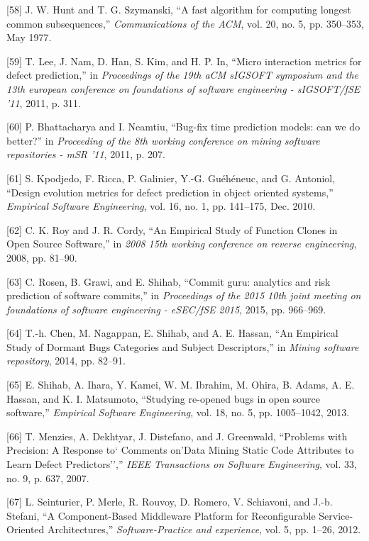 \documentclass[conference]{IEEEtran}
\begin{document}
{[}58{]} J. W. Hunt and T. G. Szymanski, ``A fast algorithm for
computing longest common subsequences,'' \emph{Communications of the
ACM}, vol. 20, no. 5, pp. 350--353, May 1977.

{[}59{]} T. Lee, J. Nam, D. Han, S. Kim, and H. P. In, ``Micro
interaction metrics for defect prediction,'' in \emph{Proceedings of the
19th aCM sIGSOFT symposium and the 13th european conference on
foundations of software engineering - sIGSOFT/fSE '11}, 2011, p. 311.

{[}60{]} P. Bhattacharya and I. Neamtiu, ``Bug-fix time prediction
models: can we do better?'' in \emph{Proceeding of the 8th working
conference on mining software repositories - mSR '11}, 2011, p. 207.

{[}61{]} S. Kpodjedo, F. Ricca, P. Galinier, Y.-G. Gu{é}h{é}neuc, and G.
Antoniol, ``Design evolution metrics for defect prediction in object
oriented systems,'' \emph{Empirical Software Engineering}, vol. 16, no.
1, pp. 141--175, Dec. 2010.

{[}62{]} C. K. Roy and J. R. Cordy, ``An Empirical Study of Function
Clones in Open Source Software,'' in \emph{2008 15th working conference
on reverse engineering}, 2008, pp. 81--90.

{[}63{]} C. Rosen, B. Grawi, and E. Shihab, ``Commit guru: analytics and
risk prediction of software commits,'' in \emph{Proceedings of the 2015
10th joint meeting on foundations of software engineering - eSEC/fSE
2015}, 2015, pp. 966--969.

{[}64{]} T.-h. Chen, M. Nagappan, E. Shihab, and A. E. Hassan, ``An
Empirical Study of Dormant Bugs Categories and Subject Descriptors,'' in
\emph{Mining software repository}, 2014, pp. 82--91.

{[}65{]} E. Shihab, A. Ihara, Y. Kamei, W. M. Ibrahim, M. Ohira, B.
Adams, A. E. Hassan, and K. I. Matsumoto, ``Studying re-opened bugs in
open source software,'' \emph{Empirical Software Engineering}, vol. 18,
no. 5, pp. 1005--1042, 2013.

{[}66{]} T. Menzies, A. Dekhtyar, J. Distefano, and J. Greenwald,
``Problems with Precision: A Response to` Comments on'Data Mining Static
Code Attributes to Learn Defect Predictors'','' \emph{IEEE Transactions
on Software Engineering}, vol. 33, no. 9, p. 637, 2007.

{[}67{]} L. Seinturier, P. Merle, R. Rouvoy, D. Romero, V. Schiavoni,
and J.-b. Stefani, ``A Component-Based Middleware Platform for
Reconfigurable Service-Oriented Architectures,'' \emph{Software-Practice
and experience}, vol. 5, pp. 1--26, 2012.
\end{document}
